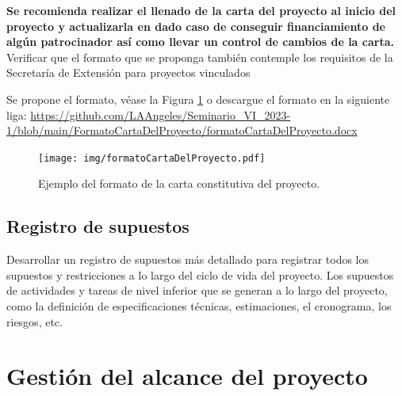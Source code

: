 \documentclass[letterpaper,12pt,openright,oneside]{article}
\theoremstyle{plain}
\begin{document}
\textbf{Se recomienda realizar el llenado de la carta del proyecto al inicio del proyecto y actualizarla en dado caso de conseguir financiamiento de algún patrocinador así como llevar un control de cambios de la carta.}
Verificar que el formato que se proponga también contemple los requisitos de la Secretaría de Extensión para proyectos vinculados

Se propone el formato, véase la Figura \ref{CartaConstitutiva} o descargue el formato en la siguiente liga: \url{https://github.com/LAAngeles/Seminario_VI_2023-1/blob/main/FormatoCartaDelProyecto/formatoCartaDelProyecto.docx}
% 
% 
\begin{figure}[h]
    \centering
    \texttt{[image: img/formatoCartaDelProyecto.pdf]}
    \caption{Ejemplo del formato de la carta constitutiva del proyecto.}
    \label{CartaConstitutiva}
\end{figure}
% 
% 
\subsection*{Registro de supuestos}

Desarrollar un registro de supuestos más detallado para registrar todos los supuestos y restricciones a lo largo del ciclo de vida del proyecto.
Los supuestos de actividades y tareas de nivel inferior que se generan a lo largo del proyecto, como la definición de especificaciones técnicas, estimaciones, el cronograma, los riesgos, etc. 
% 
% 
\section*{Gestión del alcance del proyecto}
\end{document}
